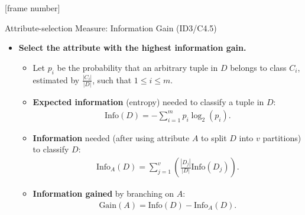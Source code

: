 \documentclass[aspectratio=169,t,table]{beamer}
\begin{document}
  {
    [frame number]
    \begin{frame}{Attribute-selection Measure: Information Gain (ID3/C4.5)}
      \begin{itemize}
        \item \textbf{Select the attribute with the highest information gain.}
        \begin{itemize}
          \item Let $p_i$ be the probability that an arbitrary tuple in $D$ belongs to class $C_i$,\\ estimated by $\frac{|C_i|}{|D|}$, such that $1 \leq i \leq m$.
          \item \textbf{Expected information} (entropy) needed to classify a tuple in $D$:
          \begin{align}
            \text{Info}(D) = -\sum_{i=1}^{m}p_i \log_2(p_i).
          \end{align}
          \item \textbf{Information} needed (after using attribute $A$ to split $D$ into $v$ partitions) to classify $D$:
          \begin{align}
            \text{Info}_A(D) = \sum_{j=1}^v \left( \frac{|D_j|}{|D|} \text{Info}(D_j) \right).
          \end{align}
          \item \textbf{Information gained} by branching on $A$:
          \begin{align}
            \text{Gain}(A)=\text{Info}(D)-\text{Info}_A(D).
          \end{align}
        \end{itemize}
      \end{itemize}
    \end{frame}
  }
\end{document}
